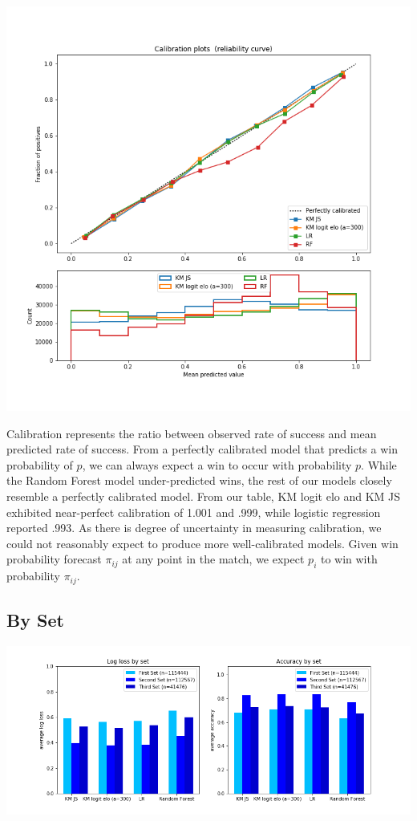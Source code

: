 \documentclass[chapterprefix=false]{report}
\begin{document}
\hspace*{-.5cm}\includegraphics[scale=.6]{calibration_plot}

Calibration represents the ratio between observed rate of success and mean predicted rate of success. From a perfectly calibrated model that predicts a win probability of $p$, we can always expect a win to occur with probability $p$. While the Random Forest model under-predicted wins, the rest of our models closely resemble a perfectly calibrated model. From our table, KM logit elo and KM JS exhibited near-perfect calibration of 1.001 and .999, while logistic regression reported .993. As there is degree of uncertainty in measuring calibration, we could not reasonably expect to produce more well-calibrated models. Given win probability forecast $\pi_{ij}$ at any point in the match, we expect $p_i$ to win with probability $\pi_{ij}$.

\subsection{By Set}


\hspace*{-1.5cm}\includegraphics[scale=.6]{set_performance}
\end{document}
